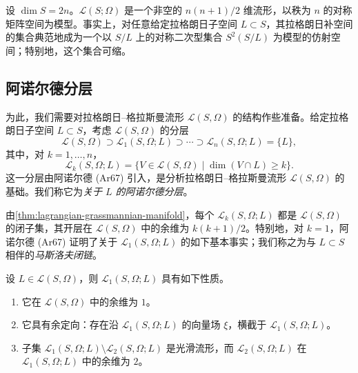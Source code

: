 \begin{theorem}\label{thm:lagrangian-grassmannian-manifold}
设 $\dim S=2n$。$\mathcal L(S;\Omega)$ 是一个非空的 $n(n+1)/2$ 维流形，以秩为 $n$ 的对称矩阵空间为模型。事实上，对任意给定拉格朗日子空间 $L\subset S$，其拉格朗日补空间的集合典范地成为一个以 $S/L$ 上的对称二次型集合 $S^2(S/L)$ 为模型的仿射空间；特别地，这个集合可缩。
\end{theorem}

\subsection{阿诺尔德分层}
\label{subsec:arnold-stratification}

为此，我们需要对拉格朗日--格拉斯曼流形 $\mathcal L(S,\Omega)$ 的结构作些准备。给定拉格朗日子空间 $L\subset S$，考虑 $\mathcal L(S,\Omega)$ 的分层
\[
 \mathcal L(S,\Omega)\supset\mathcal L_1(S,\Omega;L)\supset\cdots
 \supset\mathcal L_n(S,\Omega;L)=\{L\},
\]
其中，对 $k=1,\ldots,n$，
\[
 \mathcal L_k(S,\Omega;L)
 =\{V\in\mathcal L(S,\Omega)\mid\dim(V\cap L)\ge k\}.
\]
这一分层由阿诺尔德 (Ar67) 引入，是分析拉格朗日--格拉斯曼流形
$\mathcal L(S,\Omega)$ 的基础。我们称它为\emph{关于 $L$ 的阿诺尔德分层}。

由\cref{thm:lagrangian-grassmannian-manifold}，每个
$\mathcal L_k(S,\Omega;L)$ 都是 $\mathcal L(S,\Omega)$ 的闭子集，其开层在
$\mathcal L(S,\Omega)$ 中的余维为 $k(k+1)/2$。特别地，对 $k=1$，阿诺尔德 (Ar67) 证明了关于 $\mathcal L_1(S,\Omega;L)$ 的如下基本事实；我们称之为与 $L\subset S$ 相伴的\emph{马斯洛夫闭链}。

\begin{proposition}\label{prop:maslov-cycle-properties}
设 $L\in\mathcal L(S,\Omega)$，则 $\mathcal L_1(S,\Omega;L)$ 具有如下性质。
\begin{enumerate}[label=(\arabic*)]
\item 它在 $\mathcal L(S,\Omega)$ 中的余维为 $1$。
\item 它具有余定向：存在沿 $\mathcal L_1(S,\Omega;L)$ 的向量场 $\xi$，横截于 $\mathcal L_1(S,\Omega;L)$。
\item 子集 $\mathcal L_1(S,\Omega;L)\setminus\mathcal L_2(S,\Omega;L)$ 是光滑流形，而 $\mathcal L_2(S,\Omega;L)$ 在 $\mathcal L_1(S,\Omega;L)$ 中的余维为 $2$。
\end{enumerate}
\end{proposition}

